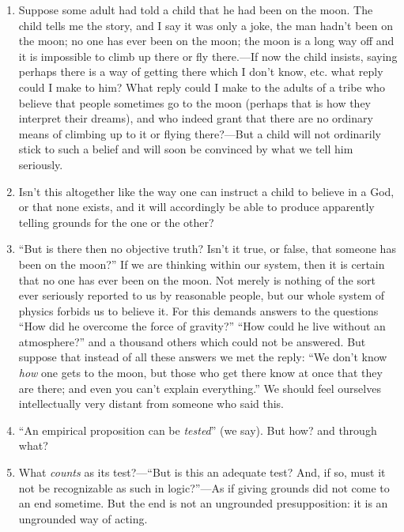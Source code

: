\documentclass{book}
\begin{document}
\begin{enumerate}
\item
Suppose some adult had told a child that he had been on the moon. The child
tells me the story, and I say it was only a joke, the man hadn't been on the
moon; no one has ever been on the moon; the moon is a long way off and it is
impossible to climb up there or fly there.---If now the child insists, saying
perhaps there is a way of getting there which I don't know, etc. what reply
could I make to him? What reply could I make to the adults of a tribe who
believe that people sometimes go to the moon (perhaps that is how they
interpret their dreams), and who indeed grant that there are no ordinary means
of climbing up to it or flying there?---But a child will not ordinarily stick
to such a belief and will soon be convinced by what we tell him seriously.

\item
Isn't this altogether like the way one can instruct a child to believe in a
God, or that none exists, and it will accordingly be able to produce apparently
telling grounds for the one or the other?

\item
``But is there then no objective truth? Isn't it true, or false, that someone
has been on the moon?'' If we are thinking within our system, then it is
certain that no one has ever been on the moon. Not merely is nothing of the
sort ever seriously reported to us by reasonable people, but our whole system
of physics forbids us to believe it. For this demands answers to the questions
``How did he overcome the force of gravity?'' ``How could he live without an
atmosphere?'' and a thousand others which could not be answered. But suppose
that instead of all these answers we met the reply: ``We don't know \emph{how}
one gets to the moon, but those who get there know at once that they are there;
and even you can't explain everything.'' We should feel ourselves
intellectually very distant from someone who said this.

\item
``An empirical proposition can be \emph{tested}'' (we say). But how? and
through what?

\item
What \emph{counts} as its test?---``But is this an adequate test? And, if so,
must it not be recognizable as such in logic?''---As if giving grounds did not
come to an end sometime. But the end is not an ungrounded presupposition: it is
an ungrounded way of acting.


\end{enumerate}
\end{document}
